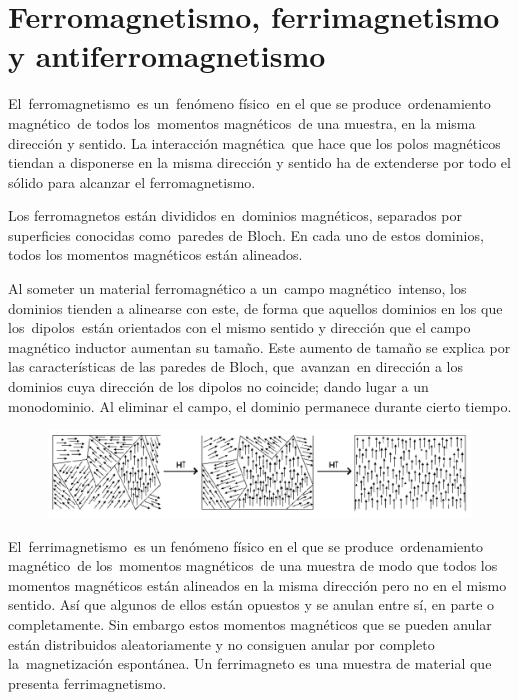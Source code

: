 \section[Ferromagnetismo, ferrimagnetismo y antiferromagnetismo]{Ferromagnetismo, ferrimagnetismo y antiferromagnetismo}

\begin{footnotesize}

El ferromagnetismo es un fenómeno físico en el que se produce ordenamiento magnético de todos los momentos magnéticos de una muestra, en la misma dirección y sentido. La interacción magnética que hace que los polos magnéticos tiendan a disponerse en la misma dirección y sentido ha de extenderse por todo el sólido para alcanzar el ferromagnetismo.

Los ferromagnetos están divididos en dominios magnéticos, separados por superficies conocidas como paredes de Bloch. En cada uno de estos dominios, todos los momentos magnéticos están alineados. 

Al someter un material ferromagnético a un campo magnético intenso, los dominios tienden a alinearse con este, de forma que aquellos dominios en los que los dipolos están orientados con el mismo sentido y dirección que el campo magnético inductor aumentan su tamaño. Este aumento de tamaño se explica por las características de las paredes de Bloch, que avanzan en dirección a los dominios cuya dirección de los dipolos no coincide; dando lugar a un monodominio. Al eliminar el campo, el dominio permanece durante cierto tiempo.

\begin{figure}[H]
	\centering
	\includegraphics[width=1\textwidth]{imagenes/imagenes28/T28IM07.png}
\end{figure}


El ferrimagnetismo es un fenómeno físico en el que se produce ordenamiento magnético de los momentos magnéticos de una muestra de modo que todos los momentos magnéticos están alineados en la misma dirección pero no en el mismo sentido. Así que algunos de ellos están opuestos y se anulan entre sí, en parte o completamente. Sin embargo estos momentos magnéticos que se pueden anular están distribuidos aleatoriamente y no consiguen anular por completo la magnetización espontánea. Un ferrimagneto es una muestra de material que presenta ferrimagnetismo. 


\end{footnotesize}

